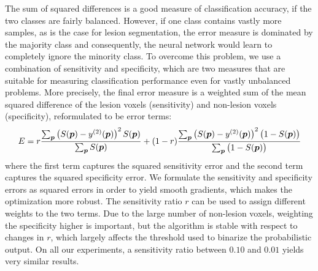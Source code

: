 The sum of squared differences is a good measure of classification accuracy, if
the two classes are fairly balanced. However, if one class contains vastly more
samples, as is the case for lesion segmentation, the error measure is dominated
by the majority class and consequently, the neural network would learn to
completely ignore the minority class. To overcome this problem, we use a
combination of sensitivity and specificity, which are two measures that are
suitable for measuring classification performance even for vastly unbalanced
problems. More precisely, the final error measure is a weighted sum of the mean
squared difference of the lesion voxels (sensitivity) and non-lesion voxels
(specificity), reformulated to be error terms:
\begin{equation} 
E = r\frac{\textstyle\sum_{\vect{p}} \left(S(\vect{p}) -
y^{(2)}(\vect{p})\right)^2 S(\vect{p})}{\textstyle\sum_{\vect{p}} S(\vect{p})}
  +
(1-r)\frac{\textstyle\sum_{\vect{p}} \left(S(\vect{p}) -
y^{(2)}(\vect{p})\right)^2 \big(1 - S(\vect{p})\big)}{%
\textstyle\sum_{\vect{p}}\big(1 - S(\vect{p})\big)}
\end{equation}
where the first term captures the squared sensitivity error and the second term
captures the squared specificity error. We formulate the sensitivity and
specificity errors as squared errors in order to yield smooth gradients, which
makes the optimization more robust. The sensitivity ratio $r$ can be used to
assign different weights to the two terms. Due to the large number of non-lesion
voxels, weighting the specificity higher is important, but the algorithm is
stable with respect to changes in $r$, which largely affects the threshold
used to binarize the probabilistic output. On all our experiments, a sensitivity
ratio between $0.10$ and $0.01$ yields very similar results.

